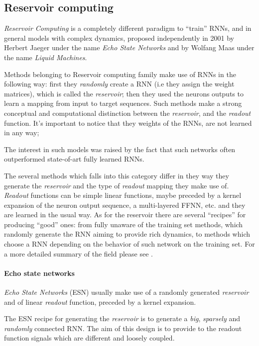 \subsection{Reservoir computing} 


\textit{Reservoir Computing} is a completely different paradigm to ``train'' RNNs, and in general models with complex 
dynamics, proposed independently in 2001 by Herbert Jaeger under the name \textit{Echo State 
Networks}\cite{echoStateNetworks} and by Wolfang Maas under the name \textit{Liquid Machines}\cite{liquidStateMachines}.

Methods belonging to Reservoir computing family make use of RNNs in the following way: first they \textit{randomly} 
create a RNN (i.e they assign the weight matrices), which is called the \textit{reservoir}; then they used the neurons
outputs to learn a mapping from input to target sequences.
Such methods make a strong conceptual and computational distinction between the \textit{reservoir}, and the 
\textit{readout} function.
It's important to notice that they weights of the RNNs, are not learned in any way;

The interest in such models was raised by the fact that such networks often outperformed state-of-art fully learned 
RNNs.


The several methods which falls into this category differ in they way they generate the \textit{reservoir} and the type 
of \textit{readout} mapping they make use of. \textit{Readout} functions can be simple linear functions, maybe preceded 
by a kernel expansion of the neuron output sequence, a multi-layered FFNN, etc. and they are learned in the usual way.
As for the reservoir there are several ``recipes'' for producing ``good'' ones: from fully unaware of the training set 
methods, which randomly generate the RNN aiming to provide rich dynamics, to methods which choose a RNN depending on 
the behavior of such network on the training set.
For a more detailed summary of the field please see \cite{reservoirSummary}.


\paragraph{Echo state networks}

\textit{Echo State Networks} (ESN) usually make use of a randomly generated \textit{reservoir} and of linear 
\textit{readout} function, preceded by a kernel expansion.

The ESN recipe for generating the \textit{reservoir} is to generate a \textit{big}, \textit{sparsely} and 
\textit{randomly} connected RNN. The aim of this design is to provide to the readout function signals which are 
different and loosely coupled.

